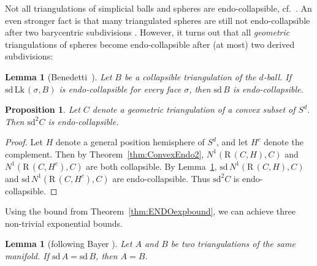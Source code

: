 \documentclass[a4paper,11pt]{article}
\theoremstyle{plain}
\newtheorem{lemma}[theorem]{Lemma}
\newtheorem{proposition}[theorem]{Proposition}
\theoremstyle{definition}
\newcommand{\RS}{\mathrm{R}\,}
\newcommand{\Lk}{\mathrm{Lk}\, }
\newcommand{\sd}{\mathrm{sd}\, }
\begin{document}
Not all triangulations of simplicial balls and spheres are endo-collapsible, cf.\ \cite[Thm.~3]{BZ}. An even stronger fact is that many triangulated spheres are still not endo-collapsible after two barycentric subdivisions \cite{Benedetti-DMT4MWB}. %
However, it turns out that all \emph{geometric} triangulations of spheres become endo-collapsible after (at most) two derived subdivisions:

\begin{lemma} [{Benedetti~\cite[Corollary~3.21]{Benedetti-DMT4MWB}}]
\label{lem:endcollapse}
Let $B$ be a collapsible triangulation of the $d$-ball. If $\sd \Lk (\sigma,B) $ is endo-collapsible for every face $\sigma$, then $\sd B$ is endo-collapsible. 
\end{lemma}

 \begin{proposition} \label{prp:sphereendo}
Let $C$ denote a geometric triangulation of a convex subset of $S^d$. Then $\mathrm{sd}^2 C$ is endo-collapsible.
\end{proposition}

\begin{proof}
Let $H$ denote a general position hemisphere of $S^d$, and let $H^c$ denote the complement. Then by Theorem~\ref{thm:ConvexEndo2}, $N^1(\RS(C,H),C)$ and $N^1(\RS(C,H^c),C)$ are both collapsible. By Lemma~\ref{lem:endcollapse}, $\sd N^1(\RS(C,H),C)$ and $\sd N^1(\RS(C,H^c),C)$ are endo-collapsible. Thus %
$\mathrm{sd}^2 C$ is endo-collapsible. 
\end{proof}

Using the bound from Theorem~\ref{thm:ENDOexpbound}, we can achieve three non-trivial exponential bounds. 

\begin{lemma}[{following Bayer \cite[Theorem 3]{Bayer}}] \label{lem:bayer}
Let $A$ and $B$ be two triangulations of the same manifold. If $\sd A= \sd B$, then $A=B$.
\end{lemma}
\end{document}

